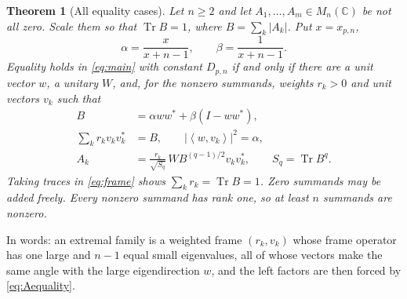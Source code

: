 \documentclass[11pt,a4paper]{article}
\numberwithin{equation}{section}
\newtheorem{theorem}{Theorem}[section]
\theoremstyle{definition}
\theoremstyle{remark}
\DeclareMathOperator{\Tr}{Tr}
\newcommand{\C}{\mathbb C}
\newcommand{\abs}[1]{\left\lvert #1\right\rvert}
\newcommand{\ip}[2]{\left\langle #1,#2\right\rangle}
\begin{document}
\begin{theorem}[All equality cases]\label{thm:equality}
Let \(n\ge2\) and let \(A_1,\ldots,A_m\in M_n(\C)\) be not all zero.
Scale them so that \(\Tr B=1\), where \(B=\sum_k|A_k|\). Put
\(x=x_{p,n}\),
\[
 \alpha=\frac{x}{x+n-1},\qquad\beta=\frac{1}{x+n-1}.
\]
Equality holds in \eqref{eq:main} with constant \(D_{p,n}\) if and only if
there are a unit vector \(w\), a unitary \(W\), and, for the nonzero
summands, weights \(r_k>0\) and unit vectors \(v_k\) such that
\begin{align}
 B&=\alpha ww^*+\beta(I-ww^*),\label{eq:Bequality}\\
 \sum_kr_kv_kv_k^*&=B,\qquad \abs{\ip{w}{v_k}}^2=\alpha,\label{eq:frame}\\
 A_k&=\frac{r_k}{\sqrt{S_q}}\,WB^{(q-1)/2}v_kv_k^*,
 \qquad S_q=\Tr B^q.\label{eq:Aequality}
\end{align}
Taking traces in \eqref{eq:frame} shows \(\sum_kr_k=\Tr B=1\). Zero
summands may be added freely. Every nonzero summand has rank one, so at
least \(n\) summands are nonzero.
\end{theorem}

In words: an extremal family is a weighted frame \((r_k,v_k)\) whose frame
operator has one large and \(n-1\) equal small eigenvalues, all of whose
vectors make the same angle with the large eigendirection \(w\), and the
left factors are then forced by \eqref{eq:Aequality}.
\end{document}
